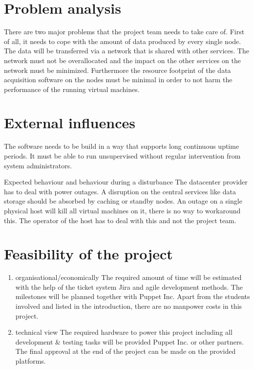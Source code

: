\section{Problem analysis}

There are two major problems that the project team needs to take care of. First
of all, it needs to cope with the amount of data produced by every single node.
The data will be transferred via a network that is shared with other services.
The network must not be overallocated and the impact on the other services on
the network must be minimized. Furthermore the resource footprint of the data
acquisition software on the nodes must be minimal in order to not harm the
performance of the running virtual machines.

\section{External influences}

The software needs to be build in a way that supports long continuous uptime
periods. It must be able to run unsupervised without regular intervention from
system administrators.

Expected behaviour and behaviour during a disturbance The datacenter provider
has to deal with power outages. A disruption on the central services like data
storage should be absorbed by caching or standby nodes. An outage on a single
physical host will kill all virtual machines on it, there is no way to
workaround this. The operator of the host has to deal with this and not the
project team.

\section{Feasibility of the project}

\begin{enumerate}
    \item organisational/economically
          The required amount of time will be estimated with the help of the
          ticket system Jira and agile development methods. The milestones will be planned
          together with Puppet Inc. Apart from the students involved and listed in the
          introduction, there are no manpower costs in this project.

    \item technical view
          The required hardware to power this project including all development
          \& testing tasks will be provided Puppet Inc. or other partners. The final
          approval at the end of the project can be made on the provided platforms.
\end{enumerate}


